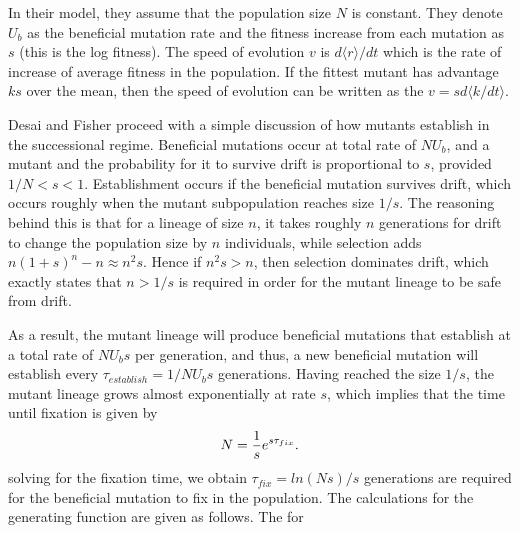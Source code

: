\documentclass[12pt]{article}
\begin{document}
In their model, they assume that the population size $N$ is constant.  They denote $U_b$ as the beneficial mutation rate and the fitness increase from each   mutation as $s$ (this is the log fitness).  The speed of evolution $v$ is $d\langle r \rangle / dt$ which is the rate of increase of average fitness in the population.  If the fittest mutant has advantage $ks$ over the mean, then the speed of evolution can be written as the $v=sd\langle k  / dt \rangle$.  

Desai and Fisher proceed with a simple discussion of how mutants establish in the successional regime.  Beneficial mutations occur at total rate of $NU_b$, and a mutant and the probability for it to survive drift is proportional to $s$, provided $1/N<s<1$.  Establishment occurs if the beneficial mutation survives drift, which occurs roughly when the mutant subpopulation reaches size $1/s$.  The reasoning behind this is that for a lineage of size $n$, it takes roughly $n$ generations for drift to change the population size by $n$ individuals, while selection adds $n(1+s)^n-n \approx n^2s$.  Hence if $n^2s>n$, then selection dominates drift, which exactly states that $n>1/s$ is required in order for the mutant lineage to be safe from drift. 

As a result, the mutant lineage will produce beneficial mutations that establish at a total rate of $NU_bs$ per generation, and thus, a new beneficial mutation will establish every $\tau_{establish} = 1/NU_bs$ generations.  Having reached the size $1/s$, the mutant lineage grows almost exponentially at rate $s$, which implies that the time until fixation is given by
\[
N={1 \over s}e^{s \tau_{fix}}.
\]
solving for the fixation time, we obtain $\tau_{fix}=ln(Ns)/s$ generations are required for the beneficial mutation to fix in the population.  
The calculations for the generating function are given as follows. The for


\end{document}
